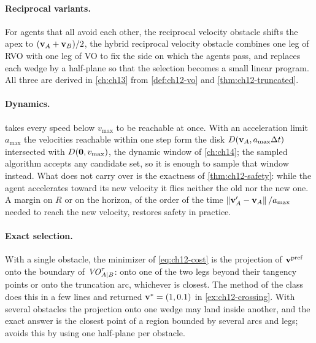 \paragraph{Reciprocal variants.}
For agents that all avoid each other, the reciprocal velocity obstacle
\cite{vandenberg2008rvo} shifts the apex to $(\mathbf{v}_A + \mathbf{v}_B)/2$, the hybrid
reciprocal velocity obstacle \cite{snape2011hrvo} combines one leg of RVO with
one leg of VO to fix the side on which the agents pass, and \orca
\cite{vandenberg2011orca} replaces each wedge by a half-plane so that the
selection becomes a small linear program. All three are derived in
\cref{ch:ch13} from \cref{def:ch12-vo} and \cref{thm:ch12-truncated}.

\paragraph{Dynamics.}
 takes every speed below $v_{\max}$ to be reachable at
once. With an acceleration limit $a_{\max}$ the velocities reachable within one
step form the disk $D(\mathbf{v}_A,a_{\max}\Delta t)$ intersected with
$D(\mathbf{0},v_{\max})$, the dynamic window of \cref{ch:ch14}; the sampled
algorithm accepts any candidate set, so it is enough to sample that window
instead. What does not carry over is the exactness of \cref{thm:ch12-safety}:
while the agent accelerates toward its new velocity it flies neither the old
nor the new one. A margin on $R$ or on the horizon, of the order of the time
$\left\lVert \mathbf{v}_A' - \mathbf{v}_A \right\rVert/a_{\max}$ needed to reach the new velocity, restores
safety in practice.

\paragraph{Exact selection.}
With a single obstacle, the minimizer of \cref{eq:ch12-cost} is the projection
of $\mathbf{v}^{\mathrm{pref}}$ onto the boundary of $\mathit{VO}^{\tau}_{A|B}$: onto one of
the two legs beyond their tangency points or onto the truncation arc,
whichever is closest. The method  of the class
 does this in a few lines and returned
$\mathbf{v}^* = (1, 0.1)$ in \cref{ex:ch12-crossing}. With several obstacles the projection onto one wedge
may land inside another, and the exact answer is the closest point of a
region bounded by several arcs and legs; \orca avoids this by using one
half-plane per obstacle.

